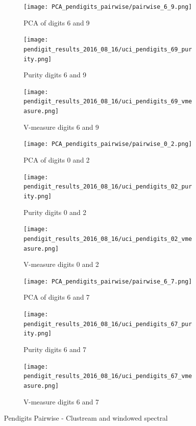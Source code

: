 \begin{figure}[H]
\begin{subfigure}{.3\textwidth}
  \centering
  \texttt{[image: PCA\_pendigits\_pairwise/pairwise\_6\_9.png]}
  \caption{PCA of digits 6 and 9}
\end{subfigure}%
\begin{subfigure}{.3\textwidth}
  \centering
  \texttt{[image: pendigit\_results\_2016\_08\_16/uci\_pendigits\_69\_purity.png]}
  \caption{Purity digits 6 and 9}
\end{subfigure}
\begin{subfigure}{.3\textwidth}
  \centering
  \texttt{[image: pendigit\_results\_2016\_08\_16/uci\_pendigits\_69\_vmeasure.png]}
  \caption{V-measure digits 6 and 9}
\end{subfigure}

\begin{subfigure}{.3\textwidth}
  \centering
  \texttt{[image: PCA\_pendigits\_pairwise/pairwise\_0\_2.png]}
  \caption{PCA of digits 0 and 2}
\end{subfigure}%
\begin{subfigure}{.3\textwidth}
  \centering
  \texttt{[image: pendigit\_results\_2016\_08\_16/uci\_pendigits\_02\_purity.png]}
  \caption{Purity digits 0 and 2}
\end{subfigure}
\begin{subfigure}{.3\textwidth}
  \centering
  \texttt{[image: pendigit\_results\_2016\_08\_16/uci\_pendigits\_02\_vmeasure.png]}
  \caption{V-measure digits 0 and 2}
\end{subfigure}

\begin{subfigure}{.3\textwidth}
  \centering
  \texttt{[image: PCA\_pendigits\_pairwise/pairwise\_6\_7.png]}
  \caption{PCA of digits 6 and 7}
\end{subfigure}%
\begin{subfigure}{.3\textwidth}
  \centering
  \texttt{[image: pendigit\_results\_2016\_08\_16/uci\_pendigits\_67\_purity.png]}
  \caption{Purity digits 6 and 7}
\end{subfigure}
\begin{subfigure}{.3\textwidth}
  \centering
  \texttt{[image: pendigit\_results\_2016\_08\_16/uci\_pendigits\_67\_vmeasure.png]}
  \caption{V-measure digits 6 and 7}
\end{subfigure}

\caption{Pendigits Pairwise - Clustream and windowed spectral}
\label{fig:uci_pendigits}
\end{figure}


